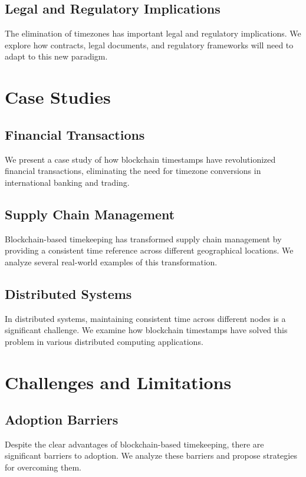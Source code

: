 \documentclass[12pt]{report}
\begin{document}
\section{Legal and Regulatory Implications}
The elimination of timezones has important legal and regulatory implications. We explore how contracts, legal documents, and regulatory frameworks will need to adapt to this new paradigm.

\chapter{Case Studies}

\section{Financial Transactions}
We present a case study of how blockchain timestamps have revolutionized financial transactions, eliminating the need for timezone conversions in international banking and trading.

\section{Supply Chain Management}
Blockchain-based timekeeping has transformed supply chain management by providing a consistent time reference across different geographical locations. We analyze several real-world examples of this transformation.

\section{Distributed Systems}
In distributed systems, maintaining consistent time across different nodes is a significant challenge. We examine how blockchain timestamps have solved this problem in various distributed computing applications.

\chapter{Challenges and Limitations}

\section{Adoption Barriers}
Despite the clear advantages of blockchain-based timekeeping, there are significant barriers to adoption. We analyze these barriers and propose strategies for overcoming them.
\end{document}
